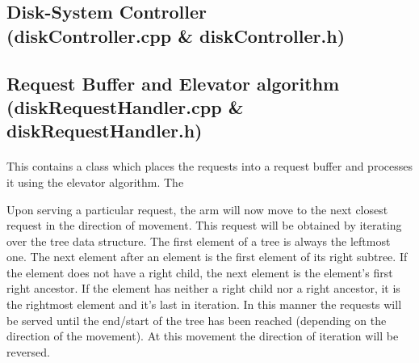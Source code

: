 \documentclass[11pt]{article}
\begin{document}
\subsection{Disk-System Controller \\ (diskController.cpp \& diskController.h)}
\paragraph{}


\subsection{Request Buffer and Elevator algorithm \\ (diskRequestHandler.cpp \& diskRequestHandler.h)}
\paragraph{}
This contains a class which places the requests into a request buffer and processes it using the elevator algorithm. The 

Upon serving a particular request, the arm will now move to the next closest request in the direction of movement. This request will be obtained by iterating over the tree data structure. The first element of a tree is always the leftmost one. The next element after an element is the first element of its right subtree. If the element does not have a right child, the next element is the element's first right ancestor. If the element has neither a right child nor a right ancestor, it is the rightmost element and it's last in iteration. In this manner the requests will be served until the end/start of the tree has been reached (depending on the direction of the movement). At this movement the direction of iteration will be reversed. 
\end{document}
